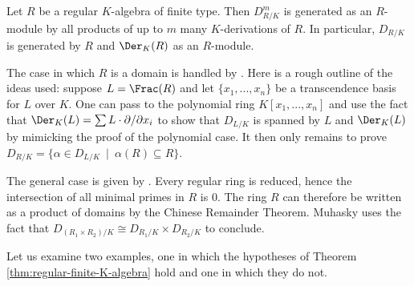 \begin{thm}\label{thm:regular-finite-K-algebra}
	Let $R$ be a regular $K$-algebra of finite type. Then $D^m_{R/K}$ is generated as an $R$-module by all products of up to $m$ many $K$-derivations of $R$. In particular, $D_{R/K}$ is generated by $R$ and $\Der_K(R)$ as an $R$-module.
\end{thm}
\begin{prf}
	The case in which $R$ is a domain is handled by \cite[Theorem 15.5.5]{mcconnell-robson}. Here is a rough outline of the ideas used: suppose $L = \Frac(R)$ and let $\{x_1,...,x_n\}$ be a transcendence basis for $L$ over $K$. One can pass to the polynomial ring $K[x_1,...,x_n]$ and use the fact that $\Der_K(L) = \sum L\cdot \partial/\partial x_i$ to show that $D_{L/K}$ is spanned by $L$ and $\Der_K(L)$ by mimicking the proof of the polynomial case. It then only remains to prove $D_{R/K} = \{\alpha \in D_{L/K} ~\mid~ \alpha(R) \subseteq R\}$.

	The general case is given by \cite[Theorem 1.15]{muhasky}. Every regular ring is reduced, hence the intersection of all minimal primes in $R$ is $0$. The ring $R$ can therefore be written as a product of domains by the Chinese Remainder Theorem. Muhasky uses the fact that $D_{(R_1\times R_2)/K} \cong D_{R_1/K} \times D_{R_2/K}$ to conclude.
\end{prf}
Let us examine two examples, one in which the hypotheses of Theorem \ref{thm:regular-finite-K-algebra} hold and one in which they do not.
